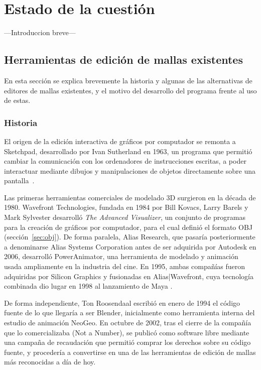 \chapter{Estado de la cuestión}
\label{cap:estadoDeLaCuestion}

---Introduccion breve---

\section{Herramientas de edición de mallas existentes}

En esta sección se explica brevemente la historia y algunas de las alternativas de editores de mallas existentes, y el motivo del desarrollo del programa frente al uso de estas.

\subsection{Historia}

El origen de la edición interactiva de gráficos por computador se remonta a Sketchpad, desarrollado por Ivan Sutherland en 1963, un programa que permitió cambiar la comunicación con los ordenadores de instrucciones escritas, a poder interactuar mediante dibujos y manipulaciones de objetos directamente sobre una pantalla~\cite{sketchpad0,sketchpad,sketchpad_history}.

Las primeras herramientas comerciales de modelado 3D surgieron en la década de 1980. Wavefront Technologies, fundada en 1984 por Bill Kovacs, Larry Barels y Mark Sylvester desarrolló \emph{The Advanced Visualizer}, un conjunto de programas para la creación de gráficos por computador, para el cual definió el formato OBJ (sección~\ref{sec:obj}). De forma paralela, Alias Research, que pasaría posteriormente a denominarse Alias Systems Corporation antes de ser adquirida por Autodesk en 2006, desarrolló PowerAnimator, una herramienta de modelado y animación usada ampliamente en la industria del cine. En 1995, ambas compañías fueron adquiridas por Silicon Graphics y fusionadas en Alias|Wavefront, cuya tecnología combinada dio lugar en 1998 al lanzamiento de Maya \cite{maya_history}.

De forma independiente, Ton Roosendaal escribió en enero de 1994 el código fuente de lo que llegaría a ser Blender, inicialmente como herramienta interna del estudio de animación NeoGeo. En octubre de 2002, tras el cierre de la compañía que lo comercializaba (Not a Number), se publicó como software libre mediante una campaña de recaudación que permitió comprar los derechos sobre su código fuente, y procedería a convertirse en una de las herramientas de edición de mallas más reconocidas a día de hoy\cite{blender_history}.

